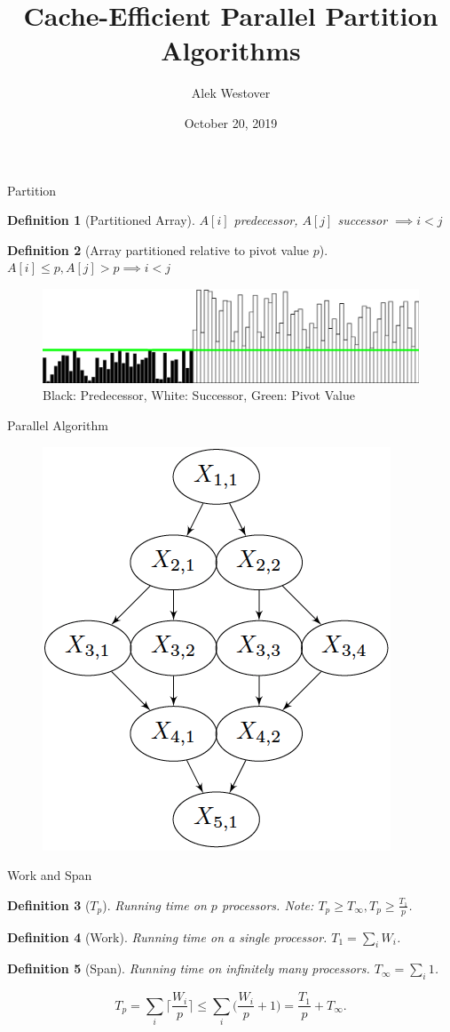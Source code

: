 \documentclass[x11names, svgnames, rgb]{beamer}
\title{Cache-Efficient Parallel Partition Algorithms}
\author{Alek Westover}
\institute{MIT PRIMES}
\date{October 20, 2019}
\newtheorem{defin}{Definition}
\begin{document}
 
\frame{\titlepage}

\begin{frame}[t]{Partition}
	\begin{defin}[Partitioned Array]
		$A[i]$ predecessor, $A[j]$ successor $\implies i < j$
	\end{defin}	
	\begin{defin}[Array partitioned relative to pivot value $p$]
		$A[i] \le p, A[j] > p \implies i < j$
	\end{defin}	
	\begin{figure}
		\includegraphics[width=\linewidth]{imgs/partitionedArray.png}
		\caption{Black: Predecessor, White: Successor, Green: Pivot Value}
	\end{figure}
\end{frame}

\begin{frame}[t]{Parallel Algorithm}
	\begin{figure}
		\includegraphics[width=0.5\linewidth]{imgs/DAG.png}
	\end{figure}
\end{frame}

\begin{frame}[t]{Work and Span}

\begin{defin}[$T_p$]
	Running time on $p$ processors. Note: $T_p \ge T_\infty, T_p \ge \frac{T_1}{p}$.
\end{defin}	
\begin{defin}[Work]
	Running time on a single processor. $T_1 = \sum_i W_i$.
\end{defin}	
\begin{defin}[Span]
	Running time on infinitely many processors. $T_\infty = \sum_i 1$.
\end{defin}	
\begin{theorem}
	$$T_p = \sum_i \Big\lceil \frac{W_i}{p} \Big\rceil \le \sum_i \Big( \frac{W_i}{p}+1 \Big) = \frac{T_1}{p}+T_\infty.$$	
\end{theorem}
\end{frame}
\end{document}
